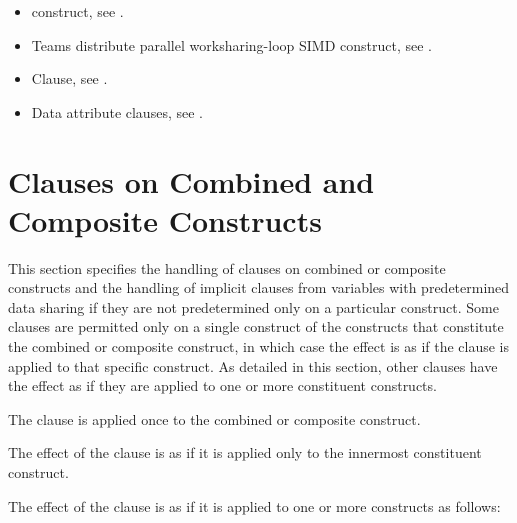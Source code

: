 \crossreferences
\begin{itemize}
\item {} construct, see .

\item Teams distribute parallel worksharing-loop SIMD construct, see
.

\item {} Clause, see .

\item Data attribute clauses, see
.
\end{itemize}



\section{Clauses on Combined and Composite Constructs}
\label{sec:Clauses on Combined and Composite Constructs}
This section specifies the handling of clauses on combined or composite constructs 
and the handling of implicit clauses from variables with predetermined data sharing 
if they are not predetermined only on a particular construct. Some clauses are 
permitted only on a single construct of the constructs that constitute the 
combined or composite construct, in which case the effect is as if the 
clause is applied to that specific construct. As detailed in this section, other 
clauses have the effect as if they are applied to one or more constituent constructs.

The  clause is applied once to the combined or composite construct.

The effect of the  clause is as if it is applied only to the innermost 
constituent construct.

The effect of the  clause is as if it is applied to one or 
more constructs as follows:

